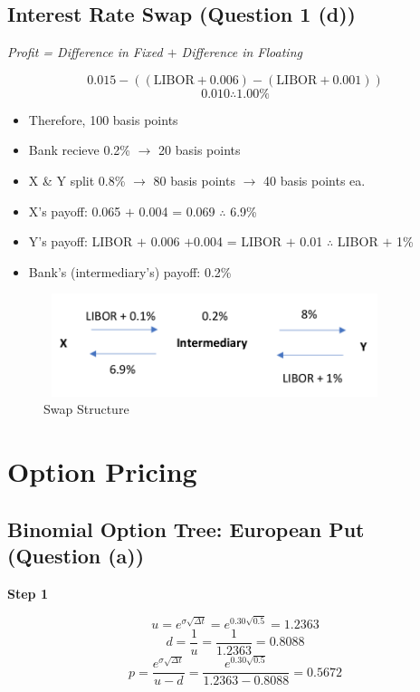 \documentclass[11pt, english]{article}
\begin{document}
	\subsection{Interest Rate Swap (Question 1 (d))}

	\textit{Profit = Difference in Fixed $+$ Difference in Floating}

	$$0.015-((\mathrm{LIBOR}+0.006)-(\mathrm{LIBOR}+0.001))$$
	$$0.010\therefore1.00\%$$

	\begin{itemize}
	\setlength\itemsep{0cm}
		\item Therefore, 100 basis points 
		\item Bank recieve 0.2\% $\rightarrow$ 20 basis points
		\item X \& Y split 0.8\% $\rightarrow$ 80 basis points $\rightarrow$ 40 basis points ea.
		\item X's payoff: 0.065 $+$ 0.004 = 0.069 $\therefore$ 6.9\%
		\item Y's payoff: LIBOR $+$ 0.006 $+$0.004 = LIBOR $+$ 0.01 $\therefore$ LIBOR $+$ 1\%
		\item Bank's (intermediary's) payoff: 0.2\%
	\end{itemize}

	\begin{figure}[H]
	\begin{center}
		\includegraphics[height=3cm,width=10cm]{AG313-IMG/c.png}
	\end{center}
		\caption{Swap Structure}
	\end{figure}

\newpage

\section{Option Pricing}

	\subsection{Binomial Option Tree: European Put (Question (a))}

	\textbf{Step 1}

	$$u=e^{\sigma\sqrt{\Delta t}}=e^{0.30\sqrt{0.5}}=1.2363$$
	$$d=\frac{1}{u}=\frac{1}{1.2363}=0.8088$$
	$$p=\frac{e^{\sigma\sqrt{\Delta t}}}{u-d}=\frac{e^{0.30\sqrt{0.5}}}{1.2363-0.8088}=0.5672$$
\end{document}
